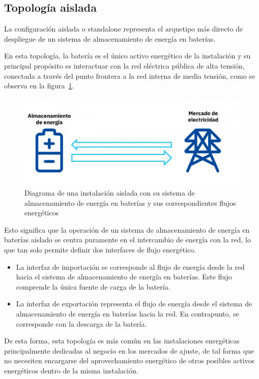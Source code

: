 \subsection{Topología aislada}
\label{makereference3.1.1}

La configuración aislada o standalone representa el arquetipo más directo de despliegue de un sistema de almacenamiento de energía en baterías.

En esta topología, la batería es el único activo energético de la instalación y su principal propósito es interactuar con la red eléctrica pública de alta tensión, conectada a través del punto frontera a la red interna de media tensión, como se observa en la figura~\ref{fig:topologia-aislada}.

\begin{figure}
\centering
\includegraphics[width=0.5\linewidth]{figures/topologia-aislada.png}
\caption{Diagrama de una instalación aislada con su sistema de almacenamiento de energía en baterías y sus correspondientes flujos energéticos}
\label{fig:topologia-aislada}
\end{figure}

Esto significa que la operación de un sistema de almacenamiento de energía en baterías aislado se centra puramente en el intercambio de energía con la red, lo que tan solo permite definir dos interfaces de flujo energético.

\begin{itemize}

\item La interfaz de importación se corresponde al flujo de energía desde la red hacia el sistema de almacenamiento de energía en baterías. Este flujo comprende la única fuente de carga de la batería.
          
\item  La interfaz de exportación representa el flujo de energía desde el sistema de almacenamiento de energía en baterías hacia la red. En contrapunto, se corresponde con la descarga de la batería.

\end{itemize}

De esta forma, esta topología es más común en las instalaciones energéticas principalmente dedicadas al negocio en los mercados de ajuste, de tal forma que no necesiten encargarse del aprovechamiento energético de otros posibles activos energéticos dentro de la misma instalación.

